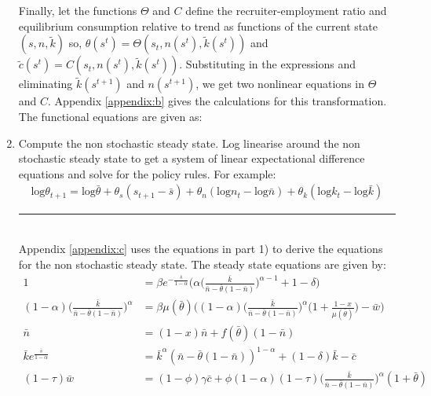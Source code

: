 \documentclass[11pt,letterpaper]{article}
\newcommand{\Hline}{\noindent\rule{17cm}{0.5pt}}
\begin{document}
\begin{enumerate}
Finally, let the functions $\Theta$ and $C$ define the
recruiter-employment ratio and equilibrium consumption relative to
trend as functions of the current state $(s,n,\tilde{k})$ so,
$\theta(s^t) = \Theta(s_t, n(s^t), \tilde{k}(s^t))$ and
$\tilde{c}(s^t) = C(s_t, n(s^t), \tilde{k}(s^t))$. Substituting in the
expressions and eliminating $\tilde{k}(s^{t+1})$ and $n(s^{t+1})$, we
get two nonlinear equations in $\Theta$ and $C$. Appendix
\ref{appendix:b} gives the calculations for this transformation. The
functional equations are given as:

\item Compute the non stochastic steady state. Log linearise around
  the non stochastic steady state to get a system of linear
  expectational difference equations and solve for the policy
  rules. For example:
  \begin{align*}
    \text{log}\theta_{t+1} = \text{log}\bar{\theta} + \theta_s
    (s_{t+1}-\bar{s}) + \theta_n (\text{log}n_t - \text{log}\bar{n}) +
    \theta_k (\text{log}k_t - \text{log}\bar{k})
  \end{align*}
\Hline \\
Appendix \ref{appendix:c} uses the equations in part 1) to derive the
equations for the non stochastic steady state. The steady state
equations are given by:
\begin{align*}
  1 &= \beta e^{-\frac{\bar{s}}{1-\alpha}}
  \bigg(\alpha \bigg(\frac{\bar{k}}{\bar{n} -
  \bar{\theta}(1-\bar{n})}\bigg)^{\alpha-1} + 1 - \delta\bigg)\\
  (1-\alpha)
  \bigg(\frac{\bar{k}}{\bar{n}-\bar{\theta}(1-\bar{n})}\bigg)^{\alpha}
  &= \beta \mu(\bar{\theta}) \bigg((1-\alpha)
    \bigg(\frac{\bar{k}}{\bar n - \bar \theta (1-\bar
    n)}\bigg)^{\alpha} \bigg(1 + \frac{1-x}{\mu(\bar \theta)} \bigg) -
    \bar{w}\bigg)\\
    \bar n &= (1-x)\bar n + f(\bar \theta) (1-\bar n)\\
  \bar k e^{\frac{\bar{s}}{1-\alpha}} &= \bar k^{\alpha} (\bar n - \bar
  \theta (1-\bar n))^{1-\alpha} + (1-\delta) \bar k - \bar c\\
  (1-\tau) \bar w &= (1-\phi) \gamma \bar c + \phi (1-\alpha) (1-\tau)
  \bigg(\frac{\bar k}{\bar n - \bar \theta (1-\bar n)} \bigg)^{\alpha}
                    (1+\bar \theta) 
\end{align*}


\end{enumerate}
\end{document}
